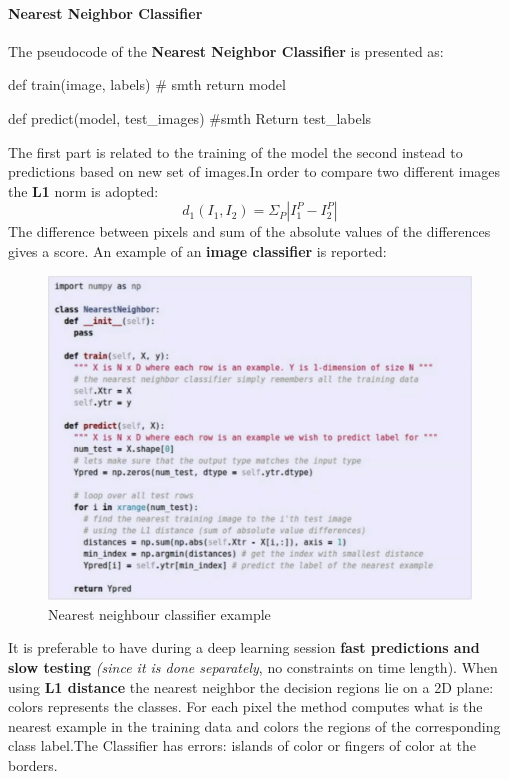 \documentclass[11pt]{article}
\begin{document}
\paragraph{Nearest Neighbor Classifier}
The pseudocode of the \textbf{Nearest Neighbor Classifier} is presented as:
\begin{python}
def train(image, labels)
# smth
return model


def predict(model, test_images)
#smth 
Return test_labels

\end{python}
The first part is related to the training of the model the second instead to predictions based on new set of images.In order to compare two different images the \textbf{L1} norm is adopted:
\begin{equation}
     d_1(I_1, I_2) = \Sigma_P |I_1^P - I_2^P|
\end{equation}{}
The difference between pixels and sum of the absolute values of the differences gives a score. An example of an \textbf{image classifier} is reported:
\clearpage
\begin{figure}[h]
\centering
\captionsetup{justification=centering}
\includegraphics[width=0.75\linewidth]{L1.pdf}
\caption{ Nearest neighbour classifier example}
\label{fig:L1}
\end{figure}
It is preferable to have during a deep learning session \textbf{fast predictions and slow testing} \textit{(since it is done separately}, no constraints on time length). When using \textbf{L1 distance} the nearest neighbor the decision regions lie on a 2D plane: colors represents the classes.
For each pixel the method computes what is the nearest example in the training data and colors the regions  of the corresponding class label.The Classifier has errors: islands of color or fingers of color at the borders.
\end{document}
